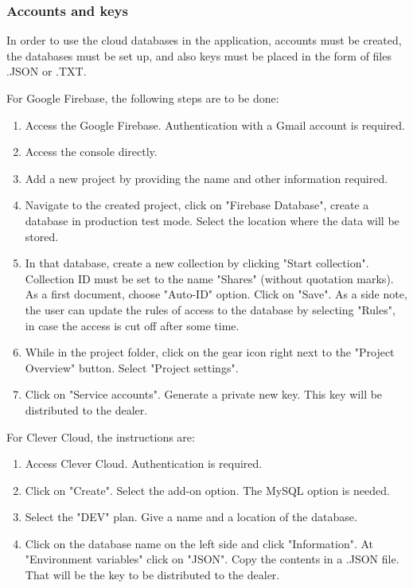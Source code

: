 \documentclass[12pt, a4paper, oneside]{book}
\begin{document}
    \subsubsection{Accounts and keys}
    In order to use the cloud databases in the application, accounts must be created, the databases must be set up, and also keys must be placed in the form of files .JSON or .TXT.
    
    For Google Firebase, the following steps are to be done:
        \begin{enumerate}
            \item Access the Google Firebase. Authentication with a Gmail account is required.
            \item Access the console directly.
            \item Add a new project by providing the name and other information required. 
            \item Navigate to the created project, click on "Firebase Database", create a database in production test mode. Select the location where the data will be stored.
            \item In that database, create a new collection by clicking "Start collection". Collection ID must be set to the name "Shares" (without quotation marks). As a first document, choose "Auto-ID" option. Click on "Save". As a side note, the user can update the rules of access to the database by selecting "Rules", in case the access is cut off after some time.
            \item While in the project folder, click on the gear icon right next to the "Project Overview" button. Select "Project settings".
            \item Click on "Service accounts". Generate a private new key. This key will be distributed to the dealer.
        \end{enumerate}
    
    For Clever Cloud, the instructions are:
        \begin{enumerate}
            \item Access Clever Cloud. Authentication is required.
            \item Click on "Create". Select the add-on option. The MySQL option is needed.
            \item Select the "DEV" plan. Give a name and a location of the database.
            \item Click on the database name on the left side and click "Information". At "Environment variables" click on "JSON". Copy the contents in a .JSON file. That will be the key to be distributed to the dealer.
        \end{enumerate}
        
\end{document}
